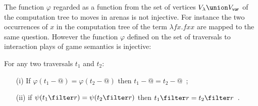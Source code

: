The function $\varphi$ regarded as a function from the set of vertices $V_\lambda \union V_{\sf var}$ of the computation tree to moves in arenas is not injective.
For instance the two occurrences of $x$ in the computation tree of the term $\lambda f x. f x x$ are mapped to the same question. However
the function $\varphi$ defined on the set of traversals to interaction plays of game semantics is injective:
\begin{lemma}
\label{lem:varphiinjective}
For any two traversals $t_1$ and $t_2$:
\begin{itemize}
\item[(i)] If $\varphi (t_1 - @ ) = \varphi (t_2 - @ )$ then $t_1-@ =t_2 -@$\ ;
\item[(ii)] if $\psi (t_1 \filter r ) = \psi (t_2 \filter r )$ then $t_1\filter r = t_2\filter r$\ .
\end{itemize}
\end{lemma}

